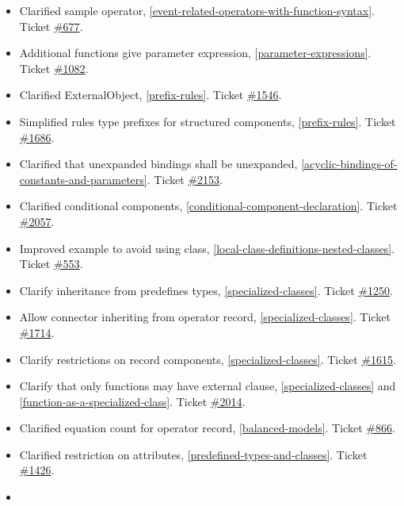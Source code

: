 \documentclass[10pt,a4paper]{report}
\begin{document}
\begin{itemize}
\item
  Clarified sample operator, \ref{event-related-operators-with-function-syntax}. Ticket
  \href{https://trac.modelica.org/Modelica/ticket/677}{\#677}.
\item
  Additional functions give parameter expression, \ref{parameter-expressions}. Ticket
  \href{https://trac.modelica.org/Modelica/ticket/1082}{\#1082}.
\item
  Clarified ExternalObject, \ref{prefix-rules}. Ticket
  \href{https://trac.modelica.org/Modelica/ticket/1546}{\#1546}.
\item
  Simplified rules type prefixes for structured components, \ref{prefix-rules}. Ticket
  \href{https://trac.modelica.org/Modelica/ticket/1686}{\#1686}.
\item
  Clarified that unexpanded bindings shall be unexpanded, \ref{acyclic-bindings-of-constants-and-parameters}.
  Ticket \href{https://trac.modelica.org/Modelica/ticket/2153}{\#2153}.
\item
  Clarified conditional components, \ref{conditional-component-declaration}. Ticket
  \href{https://trac.modelica.org/Modelica/ticket/2057}{\#2057}.
\item
  Improved example to avoid using class, \ref{local-class-definitions-nested-classes}. Ticket
  \href{https://trac.modelica.org/Modelica/ticket/553}{\#553}.
\item
  Clarify inheritance from predefines types, \ref{specialized-classes}. Ticket
  \href{https://trac.modelica.org/Modelica/ticket/1250}{\#1250}.
\item
  Allow connector inheriting from operator record, \ref{specialized-classes}. Ticket
  \href{https://trac.modelica.org/Modelica/ticket/1714}{\#1714}.
\item
  Clarify restrictions on record components, \ref{specialized-classes}. Ticket
  \href{https://trac.modelica.org/Modelica/ticket/1615}{\#1615}.
\item
  Clarify that only functions may have external clause, \ref{specialized-classes} and
  \ref{function-as-a-specialized-class}. Ticket
  \href{https://trac.modelica.org/Modelica/ticket/2014}{\#2014}.
\item
  Clarified equation count for operator record, \ref{balanced-models}. Ticket
  \href{https://trac.modelica.org/Modelica/ticket/866}{\#866}.
\item
  Clarified restriction on attributes, \ref{predefined-types-and-classes}. Ticket
  \href{https://trac.modelica.org/Modelica/ticket/1426}{\#1426}.
\item

\end{itemize}
\end{document}
